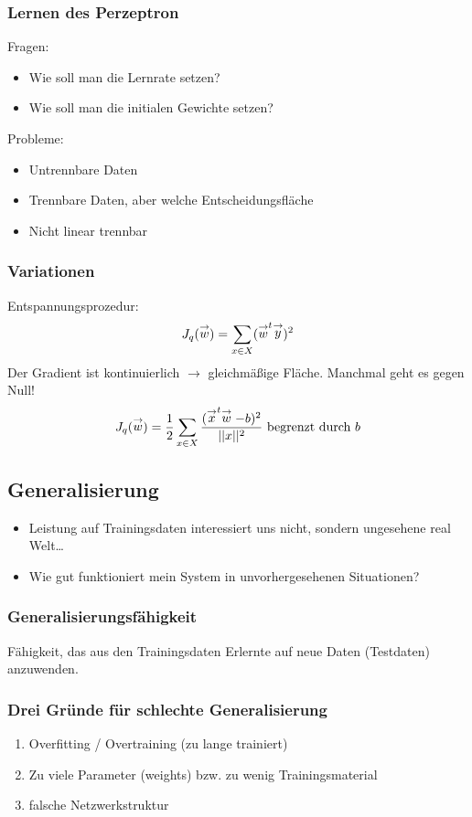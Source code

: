 \subsubsection*{Lernen des Perzeptron}

Fragen:
\begin{itemize}
\item Wie soll man die Lernrate setzen?
\item Wie soll man die initialen Gewichte setzen?
\end{itemize}
Probleme:
\begin{itemize}
\item Untrennbare Daten
\item Trennbare Daten, aber welche Entscheidungsfläche
\item Nicht linear trennbar
\end{itemize}

\subsubsection*{Variationen}

Entspannungsprozedur: $$J_q(\stackrel{\to}{w}) = \sum\limits_{x \in X} (\stackrel{\to}{w}^t \stackrel{\to}{y})^2$$
Der Gradient ist kontinuierlich $\to$ gleichmäßige Fläche. Manchmal geht es gegen Null!
$$J_q(\stackrel{\to}{w}) = \frac{1}{2} \sum\limits_{x \in X} \frac{(\stackrel{\to}{x}^t\stackrel{\to}{w} - b)^2}{||x||^2} \textrm{ begrenzt durch } b$$

\subsection{Generalisierung}

\begin{itemize}
\item Leistung auf Trainingsdaten interessiert uns nicht, sondern ungesehene real Welt\dots
\item Wie gut funktioniert mein System in unvorhergesehenen Situationen?
\end{itemize}

\subsubsection*{Generalisierungsfähigkeit}

Fähigkeit, das aus den Trainingsdaten Erlernte auf neue Daten (Testdaten) anzuwenden.

\subsubsection*{Drei Gründe für schlechte Generalisierung}
\begin{enumerate}
\item Overfitting / Overtraining (zu lange trainiert)
\item Zu viele Parameter (weights) bzw. zu wenig Trainingsmaterial
\item falsche Netzwerkstruktur
\end{enumerate}
